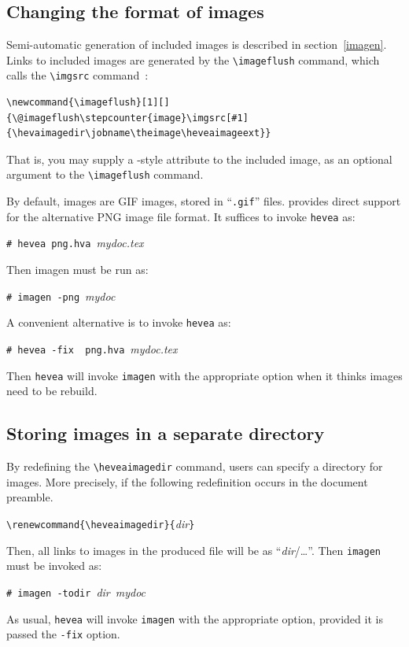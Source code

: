 \subsection{Changing the format of images}
Semi-automatic generation of included images is described in
section~\ref{imagen}.
Links to included images are generated by the \verb+\imageflush+
command, which calls the \verb+\imgsrc+ command~:
\begin{verbatim}
\newcommand{\imageflush}[1][]
{\@imageflush\stepcounter{image}\imgsrc[#1]{\hevaimagedir\jobname\theimage\heveaimageext}}
\end{verbatim}
That is, you may supply a \html-style attribute to the included image,
as an optional argument to the \verb+\imageflush+ command.

By default, images are GIF images, stored in ``\texttt{.gif}'' files.
\hevea{} provides direct support for the alternative PNG image file
format.
It suffices to invoke \texttt{hevea} as:
\begin{flushleft}
\texttt{\#~hevea~png.hva}~\textit{mydoc.tex}
\end{flushleft}
Then imagen must be run as:
\begin{flushleft}
\texttt{\#~imagen~-png}~\textit{mydoc}
\end{flushleft}

A convenient alternative is to invoke \texttt{hevea} as:
\begin{flushleft}
\texttt{\#~hevea~-fix~~png.hva}~\textit{mydoc.tex}
\end{flushleft}
Then \texttt{hevea} will invoke \texttt{imagen} with the appropriate
option when it thinks images need to be rebuild.


\subsection{Storing images in a separate directory}
By redefining the \verb+\heveaimagedir+ command, users can specify a
directory for images.
More precisely, if the following redefinition occurs in the document
preamble.
\begin{flushleft}
\verb+\renewcommand{\heveaimagedir}{+\textit{dir}\verb+}+
\end{flushleft}
Then, all links to images in the produced \html{} file will be as
``\textit{dir}/\ldots''.
Then \texttt{imagen} must be invoked as:
\begin{flushleft}
\texttt{\#~imagen~-todir}~\textit{dir}~\textit{mydoc}
\end{flushleft}
As usual, \texttt{hevea} will invoke \texttt{imagen} with the
appropriate option, provided it is passed the \texttt{-fix} option.


